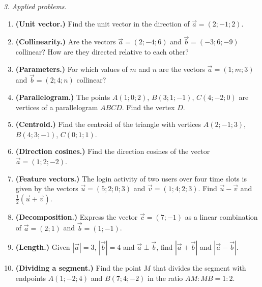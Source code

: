 \emph{3. Applied problems.}
\bigskip
\begin{enumerate}[label=\arabic*., leftmargin=*]
\item \textbf{(Unit vector.)} Find the unit vector in the direction of $\vec a=(2;-1;2)$.
\item \textbf{(Collinearity.)} Are the vectors $\vec a=(2;-4;6)$ and $\vec b=(-3;6;-9)$ collinear? How are they directed relative to each other?
\item \textbf{(Parameters.)} For which values of $m$ and $n$ are the vectors $\vec a=(1;m;3)$ and $\vec b=(2;4;n)$ collinear?
\item \textbf{(Parallelogram.)} The points $A(1;0;2)$, $B(3;1;-1)$, $C(4;-2;0)$ are vertices of a parallelogram $ABCD$. Find the vertex $D$.
\item \textbf{(Centroid.)} Find the centroid of the triangle with vertices $A(2;-1;3)$, $B(4;3;-1)$, $C(0;1;1)$.
\item \textbf{(Direction cosines.)} Find the direction cosines of the vector $\vec a=(1;2;-2)$.
\item \textbf{(Feature vectors.)} The login activity of two users over four time slots is given by the vectors $\vec u=(5;2;0;3)$ and $\vec v=(1;4;2;3)$. Find $\vec u-\vec v$ and $\frac12(\vec u+\vec v)$.
\item \textbf{(Decomposition.)} Express the vector $\vec c=(7;-1)$ as a linear combination of $\vec a=(2;1)$ and $\vec b=(1;-1)$.
\item \textbf{(Length.)} Given $|\vec a|=3$, $|\vec b|=4$ and $\vec a\perp\vec b$, find $|\vec a+\vec b|$ and $|\vec a-\vec b|$.
\item \textbf{(Dividing a segment.)} Find the point $M$ that divides the segment with endpoints $A(1;-2;4)$ and $B(7;4;-2)$ in the ratio $AM:MB=1:2$.
\end{enumerate}

